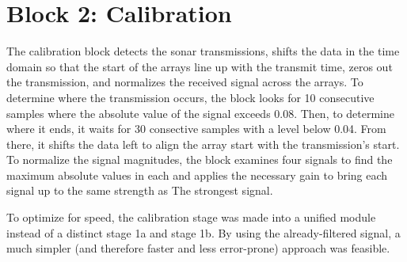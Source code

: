 
\section{Block 2: Calibration}

The calibration block detects the sonar transmissions, shifts the data in the time domain so that the start
 of the arrays line up with the transmit time, zeros out the transmission, and normalizes the received signal
 across the arrays. To determine where the transmission occurs, the block looks for 10 consecutive samples where
 the absolute value of the signal exceeds 0.08. Then, to determine where it ends, it waits for 30 consective
 samples with a level below 0.04. From there, it shifts the data left to align the array start with the
 transmission's start. To normalize the signal magnitudes, the block examines four signals to find the maximum
 absolute values in each and applies the necessary gain to bring each signal up to the same strength as The
 strongest signal.

To optimize for speed, the calibration stage was made into a unified module instead of a distinct stage 1a and
 stage 1b. By using the already-filtered signal, a much simpler (and therefore faster and less error-prone)
 approach was feasible. 